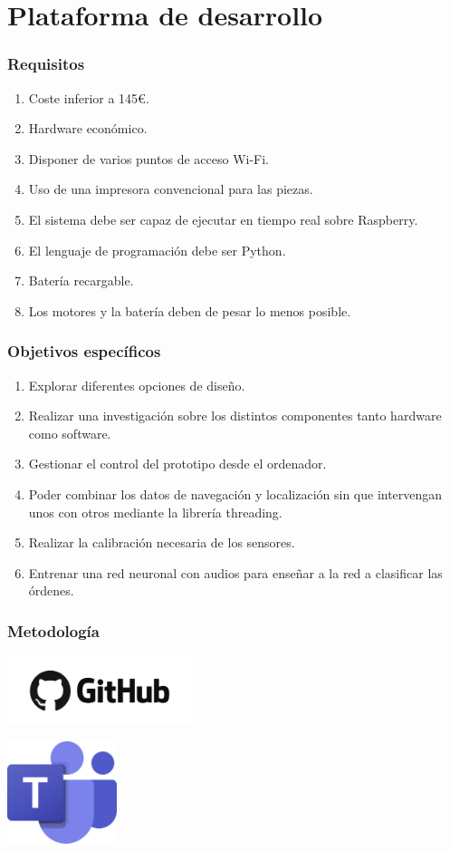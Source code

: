 \documentclass{beamer}
\begin{document}
\section{Plataforma de desarrollo}
\begin{frame}
\frametitle{Requisitos}
\begin{enumerate}
\item Coste inferior a 145€.
\item Hardware económico.
\item Disponer de varios puntos de acceso Wi-Fi.
\item Uso de una impresora convencional para las piezas.
\item El sistema debe ser capaz de ejecutar en tiempo real sobre Raspberry.
\item El lenguaje de programación debe ser Python.
\item Batería recargable.
\item Los motores y la batería deben de pesar lo menos posible.
\end{enumerate}
\end{frame}

\begin{frame}
\frametitle{Objetivos específicos}
\begin{enumerate}
\item Explorar diferentes opciones de diseño.
\item Realizar una investigación sobre los distintos componentes tanto hardware como software.
\item Gestionar el control del prototipo desde el ordenador.
\item Poder combinar los datos de navegación y localización sin que intervengan
unos con otros mediante la librería threading.
\item Realizar la calibración necesaria de los sensores.
\item Entrenar una red neuronal con audios para enseñar a la red
a clasificar las órdenes.
\end{enumerate}
\end{frame}

\begin{frame}
\frametitle{Metodología}
\centering
\begin{minipage}{0.45\textwidth}
    \centering
    \includegraphics[width=5.4cm]{figs/git.png}
\end{minipage}
\hfill
\begin{minipage}{0.45\textwidth}
    \centering
    \includegraphics[width=3.2cm]{figs/teams.png}
\end{minipage}
\end{frame}
\end{document}
